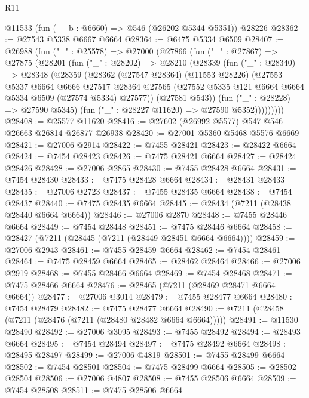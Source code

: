 \begin{lexlean}{R11}
\begin{coremodule}
    @11533
    (fun (__b : @6660) => @546 (@26202 @5344 @5351))
    @28226
@28362 := @27543 @5338 @6667 @6664
@28364 := @6475 @5334 @6509
@28407 := @26988
    (fun ("_" : @25578) =>
    @27000
      (@27866
        (fun ("_" : @27867) =>
        @27875
          (@28201
            (fun ("_" : @28202) =>
            @28210
              (@28339
                (fun ("_" : @28340) =>
                @28348
                  (@28359
                    (@28362
                      (@27547 @28364)
                      (@11553 @28226)
                      (@27553
                        @5337
                        @6664
                        @6666
                        @27517
                        @28364
                        @27565
                        (@27552 @5335 @121 @6664 @6664 @5334 @6509 (@27574 @5334) @27577))
                      (@27581 @543))
                    (fun ("_" : @28228) => @27590 @5345)
                    (fun ("_" : @28227 @11620) => @27590 @5352)))))))))
@28408 := @25577 @11620
@28416 := @27602 (@26992 @5577) @547 @546 @26663 @26814 @26877 @26938
@28420 := @27001 @5360 @5468 @5576 @6669
@28421 := @27006 @2914
@28422 := @7455 @28421
@28423 := @28422 @6664
@28424 := @7454 @28423
@28426 := @7475 @28421 @6664
@28427 := @28424 @28426
@28428 := @27006 @2865
@28430 := @7455 @28428 @6664
@28431 := @7454 @28430
@28433 := @7475 @28428 @6664
@28434 := @28431 @28433
@28435 := @27006 @2723
@28437 := @7455 @28435 @6664
@28438 := @7454 @28437
@28440 := @7475 @28435 @6664
@28445 := @28434 (@7211 (@28438 @28440 @6664 @6664))
@28446 := @27006 @2870
@28448 := @7455 @28446 @6664
@28449 := @7454 @28448
@28451 := @7475 @28446 @6664
@28458 := @28427 (@7211 (@28445 (@7211 (@28449 @28451 @6664 @6664))))
@28459 := @27006 @2943
@28461 := @7455 @28459 @6664
@28462 := @7454 @28461
@28464 := @7475 @28459 @6664
@28465 := @28462 @28464
@28466 := @27006 @2919
@28468 := @7455 @28466 @6664
@28469 := @7454 @28468
@28471 := @7475 @28466 @6664
@28476 := @28465 (@7211 (@28469 @28471 @6664 @6664))
@28477 := @27006 @3014
@28479 := @7455 @28477 @6664
@28480 := @7454 @28479
@28482 := @7475 @28477 @6664
@28490 := @7211 (@28458 (@7211 (@28476 (@7211 (@28480 @28482 @6664 @6664)))))
@28491 := @11530 @28490
@28492 := @27006 @3095
@28493 := @7455 @28492
@28494 := @28493 @6664
@28495 := @7454 @28494
@28497 := @7475 @28492 @6664
@28498 := @28495 @28497
@28499 := @27006 @4819
@28501 := @7455 @28499 @6664
@28502 := @7454 @28501
@28504 := @7475 @28499 @6664
@28505 := @28502 @28504
@28506 := @27006 @4807
@28508 := @7455 @28506 @6664
@28509 := @7454 @28508
@28511 := @7475 @28506 @6664

\end{coremodule}
\end{lexlean}
